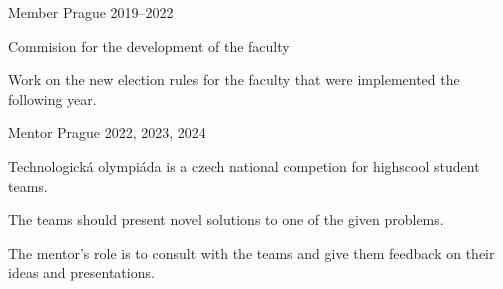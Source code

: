 

\cventry
    {Member} %
    {} %
    {Prague} %
    {2019--2022} %
    {
      \begin{cvitems} %
        \item {Commision for the development of the faculty}
        \item {Work on the new election rules for the faculty that were implemented the following year.}
      \end{cvitems}
    }

\cventry
    {Mentor} %
    {} %
    {Prague} %
    {2022, 2023, 2024} %
    {
      \begin{cvitems} %
        \item {Technologická olympiáda is a czech national competion for highscool student teams.}
        \item {The teams should present novel solutions to one of the given problems.}
        \item {The mentor's role is to consult with the teams and give them feedback on their ideas and presentations.}
      \end{cvitems}
    }




